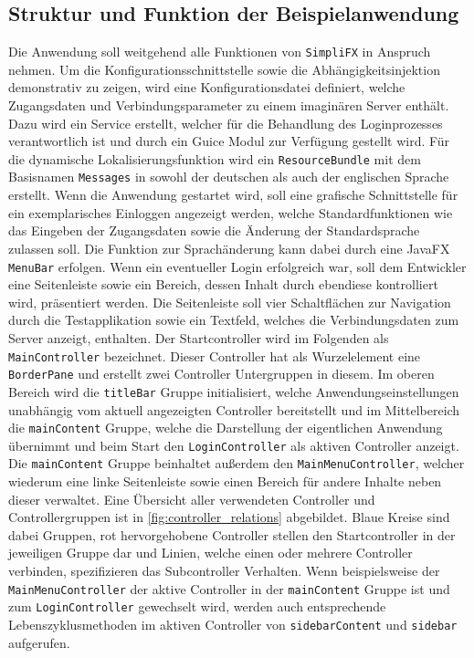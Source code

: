 \subsection{Struktur und Funktion der Beispielanwendung}
Die Anwendung soll weitgehend alle Funktionen von \texttt{SimpliFX} in Anspruch nehmen. Um die Konfigurationsschnittstelle sowie die Abhängigkeitsinjektion demonstrativ zu zeigen, wird eine Konfigurationsdatei definiert, welche Zugangsdaten und Verbindungsparameter zu einem imaginären Server enthält. Dazu wird ein Service erstellt, welcher für die Behandlung des Loginprozesses verantwortlich ist und durch ein Guice Modul zur Verfügung gestellt wird. Für die dynamische Lokalisierungsfunktion wird ein \texttt{ResourceBundle} mit dem Basisnamen \texttt{Messages} in sowohl der deutschen als auch der englischen Sprache erstellt. Wenn die Anwendung gestartet wird, soll eine grafische Schnittstelle für ein exemplarisches Einloggen angezeigt werden, welche Standardfunktionen wie das Eingeben der Zugangsdaten sowie die Änderung der Standardsprache zulassen soll. Die Funktion zur Sprachänderung kann dabei durch eine JavaFX \texttt{MenuBar} erfolgen. Wenn ein eventueller Login erfolgreich war, soll dem Entwickler eine Seitenleiste sowie ein Bereich, dessen Inhalt durch ebendiese kontrolliert wird, präsentiert werden. Die Seitenleiste soll vier Schaltflächen zur Navigation durch die Testapplikation sowie ein Textfeld, welches die Verbindungsdaten zum Server anzeigt, enthalten. Der Startcontroller wird im Folgenden als \texttt{MainController} bezeichnet. 
Dieser Controller hat als Wurzelelement eine \texttt{BorderPane} und erstellt zwei Controller Untergruppen in diesem. Im oberen Bereich wird die \texttt{titleBar} Gruppe initialisiert, welche Anwendungseinstellungen unabhängig vom aktuell angezeigten Controller bereitstellt und im Mittelbereich die \texttt{mainContent} Gruppe, welche die Darstellung der eigentlichen Anwendung übernimmt und beim Start den \texttt{LoginController} als aktiven Controller anzeigt. Die \texttt{mainContent} Gruppe beinhaltet außerdem den \texttt{MainMenuController}, welcher wiederum eine linke Seitenleiste sowie einen Bereich für andere Inhalte neben dieser verwaltet. Eine Übersicht aller verwendeten Controller und Controllergruppen ist in \autoref{fig:controller_relations} abgebildet. Blaue Kreise sind dabei Gruppen, rot hervorgehobene Controller stellen den Startcontroller in der jeweiligen Gruppe dar und Linien, welche einen oder mehrere Controller verbinden, spezifizieren das Subcontroller Verhalten. Wenn beispielsweise der \texttt{MainMenuController} der aktive Controller in der \texttt{mainContent} Gruppe ist und zum \texttt{LoginController} gewechselt wird, werden auch entsprechende Lebenszyklusmethoden im aktiven Controller von \texttt{sidebarContent} und \texttt{sidebar} aufgerufen.
